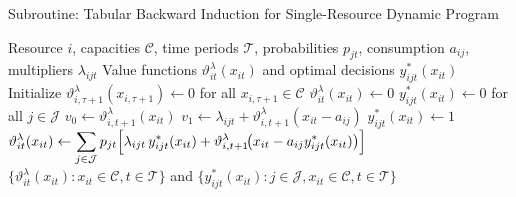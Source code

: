 \documentclass[11pt]{article}
\begin{document}
\begin{algorithm}[H]
\caption{Subroutine: Tabular Backward Induction for Single-Resource Dynamic Program}
\begin{algorithmic}[1]
\Require Resource $i$, capacities $\mathcal{C}$, time periods $\mathcal{T}$, probabilities $p_{jt}$, consumption $a_{ij}$, multipliers $\lambda_{ijt}$
\Ensure Value functions $\vartheta^\lambda_{it}(x_{it})$ and optimal decisions $y^*_{ijt}(x_{it})$
\State Initialize $\vartheta^\lambda_{i,\tau+1}(x_{i,\tau+1}) \gets 0$ for all $x_{i,\tau+1} \in \mathcal{C}$ 
 
     
        \State $\vartheta^\lambda_{it}(x_{it}) \gets 0$
        \State $y^*_{ijt}(x_{it}) \gets 0$ for all $j \in \mathcal{J}$ 
         
             
                \State $v_0 \gets \vartheta^\lambda_{i,t+1}(x_{it})$ 
                \State $v_1 \gets \lambda_{ijt} + \vartheta^\lambda_{i,t+1}(x_{it} - a_{ij})$ 
                    \State $y^*_{ijt}(x_{it}) \gets 1$ 
                \EndIf
            \EndIf
        \EndFor
        \State $\displaystyle \vartheta^\lambda_{it}(x_{it}) \gets \sum_{j\in\mathcal{J}} p_{jt}\Bigl[ \lambda_{ijt}\,y^*_{ijt}(x_{it}) + \vartheta^\lambda_{i,t+1}\!\bigl(x_{it}-a_{ij}y^*_{ijt}(x_{it})\bigr) \Bigr]$
    \EndFor
\EndFor
\State \Return $\{\vartheta^\lambda_{it}(x_{it}): x_{it} \in \mathcal{C}, t \in \mathcal{T}\}$ and $\{y^*_{ijt}(x_{it}): j \in \mathcal{J}, x_{it} \in \mathcal{C}, t \in \mathcal{T}\}$
\end{algorithmic}
\end{algorithm}

\vspace{0.5cm}






\end{document}
